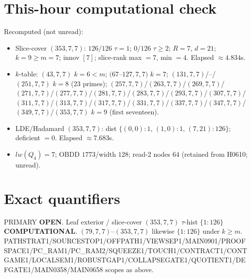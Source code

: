 \documentclass[11pt]{article}
\begin{document}
\section*{This-hour computational check}
Recomputed (not unread):
\begin{itemize}
\item Slice-cover $(353,7,7)$: $126/126$ $\tau{=}1$; $0/126$ $\tau{\ge}2$; $R{=}7$, $d{=}21$;
  $k{=}9{\ge}m{=}7$; innov $[7]$; slice-rank max $=7$, min $=4$. Elapsed $\approx4.834$s.
\item $k$-table: $(43,7,7)$ $k{=}6{<}m$; $(67$--$127,7,7)$ $k{=}7$;
  $(131,7,7)$/--/$(251,7,7)$ $k{=}8$ (23 primes); $(257,7,7)$/$(263,7,7)$/$(269,7,7)$/$(271,7,7)$/$(277,7,7)$/$(281,7,7)$/$(283,7,7)$/$(293,7,7)$/$(307,7,7)$/$(311,7,7)$/$(313,7,7)$/$(317,7,7)$/$(331,7,7)$/$(337,7,7)$/$(347,7,7)$/$(349,7,7)$/$(353,7,7)$ $k{=}9$ (first seventeen).
\item LDE/Hadamard $(353,7,7)$: dist $\{(0,0){:}1,\,(1,0){:}1,\,(7,21){:}126\}$; deficient $=0$. Elapsed $\approx7.683$s.
\item $lw(Q_4)=7$; OBDD $1773$/width $128$; read-$2$ nodes $64$ (retained from H0610; unread).
\end{itemize}

\section*{Exact quantifiers}
PRIMARY \textbf{OPEN}. Leaf exterior / slice-cover $(353,7,7)$ $\tau$-hist $\{1{:}126\}$ \textbf{COMPUTATIONAL}.
$(79,7,7)$--$(353,7,7)$ likewise $\{1{:}126\}$ under $k{\ge}m$.
PATHSTRAT1/SOURCESTOP1/OFFPATH1/VIEWSEP1/MAIN0901/PROOFSPACE1/PC\_RAM1/PC\_RAM2/SQUEEZE1/TOUCH1/CONTRACT1/CONTGAME1/LOCALSEM1/ROBUSTGAP1/COLLAPSEGATE1/QUOTIENT1/DEFGATE1/MAIN0358/MAIN0658 scopes as above.
\end{document}
